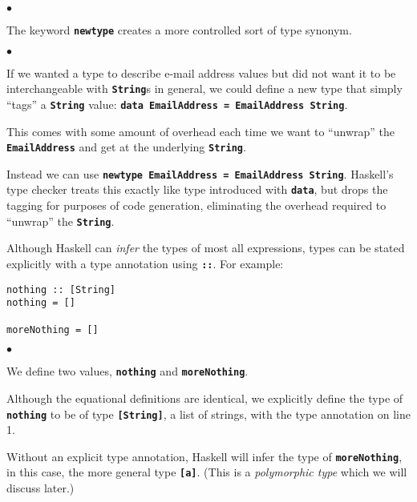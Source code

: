 \documentclass[12pt]{article}
\newcommand\code[1]{\texttt{\textbf{#1}}}
\newenvironment{notelist}{\begin{list}
   {$\bullet$}
   {\setlength{\itemsep}{0in}}}
   {\end{list}}
\begin{document}
\begin{notelist}
\item The keyword \code{newtype} creates a more controlled sort of type synonym.
\begin{notelist}
    \item If we wanted a type to describe e-mail address values but did not want it to be
          interchangeable with \code{String}s in general, we could define a new type that simply ``tags''
          a \code{String} value: \code{data EmailAddress = EmailAddress String}.
    \item This comes with some amount of overhead each time we want to ``unwrap'' the \code{EmailAddress} and
          get at the underlying \code{String}.
    \item Instead we can use \code{newtype EmailAddress = EmailAddress String}. Haskell's type checker treats
          this exactly like type introduced with \code{data}, but drops the tagging for purposes of code
          generation, eliminating the overhead required to ``unwrap'' the \code{String}.
\end{notelist}

\item Although Haskell can \textit{infer} the types of most all expressions, types can be stated explicitly
      with a type annotation using \code{::}. For example:
\begin{lstlisting}
nothing :: [String]
nothing = []

moreNothing = []
\end{lstlisting}
\begin{notelist}
    \item We define two values, \code{nothing} and \code{moreNothing}.
    \item Although the equational definitions are identical, we explicitly define the type of
          \code{nothing} to be of type \code{[String]}, a list of strings, with the type
          annotation on line 1.
    \item Without an explicit type annotation, Haskell will infer the type of \code{moreNothing},
          in this case, the more general type \code{[a]}. (This is a \textit{polymorphic type} which
          we will discuss later.)
\end{notelist}


\end{notelist}
\end{document}

